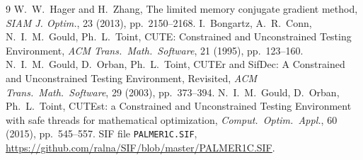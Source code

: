 \documentclass[11pt]{article}
\begin{document}
\begin{thebibliography}{9}
 W.~W.~Hager and H.~Zhang, The limited memory conjugate gradient
  method, \emph{SIAM J. Optim.}, 23 (2013), pp.~2150--2168.
 I.~Bongartz, A.~R.~Conn, N.~I.~M.~Gould, Ph.~L.~Toint,
  CUTE: Constrained and Unconstrained Testing Environment,
  \emph{ACM Trans.\ Math.\ Software}, 21 (1995), pp.~123--160.
 N.~I.~M.~Gould, D.~Orban, Ph.~L.~Toint, CUTEr and SifDec: A
  Constrained and Unconstrained Testing Environment, Revisited,
  \emph{ACM Trans.\ Math.\ Software}, 29 (2003), pp.~373--394.
 N.~I.~M.~Gould, D.~Orban, Ph.~L.~Toint, CUTEst: a Constrained and
  Unconstrained Testing Environment with safe threads for mathematical
  optimization, \emph{Comput.\ Optim.\ Appl.}, 60 (2015), pp.~545--557.
 SIF file \texttt{PALMER1C.SIF},
  \url{https://github.com/ralna/SIF/blob/master/PALMER1C.SIF}.
\end{thebibliography}
\end{document}
